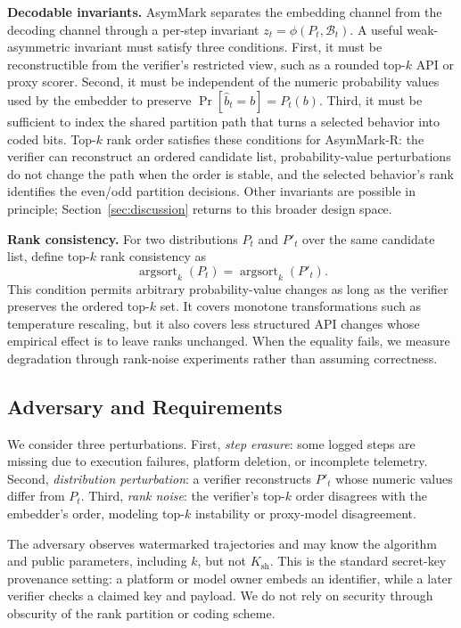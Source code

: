 \documentclass[conference,compsoc]{IEEEtran}
\newcommand{\framework}{AsymMark}
\newcommand{\ours}{AsymMark-R}
\newcommand{\B}{\mathcal{B}}
\begin{document}
\textbf{Decodable invariants.}
\framework{} separates the embedding channel from the decoding channel through a per-step invariant $z_t=\phi(P_t,\B_t)$. A useful weak-asymmetric invariant must satisfy three conditions. First, it must be reconstructible from the verifier's restricted view, such as a rounded top-$k$ API or proxy scorer. Second, it must be independent of the numeric probability values used by the embedder to preserve $\Pr[\hat b_t=b]=P_t(b)$. Third, it must be sufficient to index the shared partition path that turns a selected behavior into coded bits. Top-$k$ rank order satisfies these conditions for \ours{}: the verifier can reconstruct an ordered candidate list, probability-value perturbations do not change the path when the order is stable, and the selected behavior's rank identifies the even/odd partition decisions. Other invariants are possible in principle; Section~\ref{sec:discussion} returns to this broader design space.

\textbf{Rank consistency.}
For two distributions $P_t$ and $P'_t$ over the same candidate list, define top-$k$ rank consistency as
\begin{equation}
  \operatorname{argsort}_k(P_t)=\operatorname{argsort}_k(P'_t).
\end{equation}
This condition permits arbitrary probability-value changes as long as the verifier preserves the ordered top-$k$ set. It covers monotone transformations such as temperature rescaling, but it also covers less structured API changes whose empirical effect is to leave ranks unchanged. When the equality fails, we measure degradation through rank-noise experiments rather than assuming correctness.

\subsection{Adversary and Requirements}

We consider three perturbations. First, \emph{step erasure}: some logged steps are missing due to execution failures, platform deletion, or incomplete telemetry. Second, \emph{distribution perturbation}: a verifier reconstructs $P'_t$ whose numeric values differ from $P_t$. Third, \emph{rank noise}: the verifier's top-$k$ order disagrees with the embedder's order, modeling top-$k$ instability or proxy-model disagreement.

The adversary observes watermarked trajectories and may know the algorithm and public parameters, including $k$, but not $K_{\mathrm{sh}}$. This is the standard secret-key provenance setting: a platform or model owner embeds an identifier, while a later verifier checks a claimed key and payload. We do not rely on security through obscurity of the rank partition or coding scheme.
\end{document}
